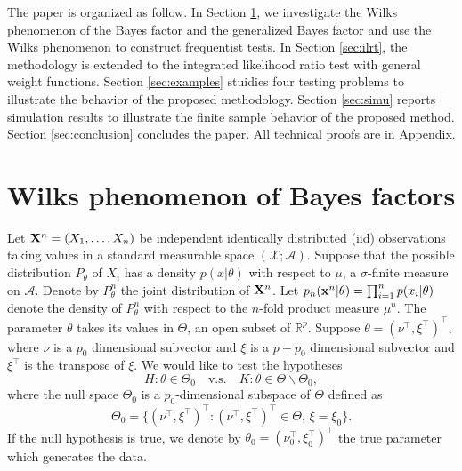 \documentclass[11pt]{article}
\newcommand{\myT}{\intercal}
\theoremstyle{plain}
\theoremstyle{definition}
\theoremstyle{remark}
\begin{document}
The paper is organized as follow.
In Section \ref{sec:wilks}, we investigate the Wilks phenomenon of the Bayes factor and the generalized Bayes factor and use the Wilks phenomenon to construct frequentist tests.
In Section \ref{sec:ilrt}, the methodology is extended to the integrated likelihood ratio test with general weight functions.
Section \ref{sec:examples} stuidies four testing problems to illustrate the behavior of the proposed methodology.
Section \ref{sec:simu} reports simulation results to illustrate the finite sample behavior of the proposed method.
Section \ref{sec:conclusion} concludes the paper.
All technical proofs are in Appendix.






\section{Wilks phenomenon of Bayes factors} \label{sec:wilks}

Let $\mathbf{X}^{n}=(X_1,\ldots,X_n)$ be independent identically distributed (iid) observations taking values in a standard measurable space $(\mathcal{X};\mathscr{A})$.
Suppose that the possible distribution $P_\theta$ of $X_i$ has a density $p(x|\theta)$ with respect to $\mu$, a $\sigma$-finite measure on $\mathscr{A}$. %
Denote by $P_{\theta}^{n}$ the joint distribution of $\mathbf{X}^{n}$.
Let $p_{n}(\mathbf{x}^{n}|\theta)=\prod_{i=1}^n p(x_i|\theta)$ denote the density of $P_{\theta}^n$ with respect to the $n$-fold product measure $\mu^n$.
The parameter $\theta$ takes its values in $\Theta$, an open subset of $\mathbb{R}^{p}$.
Suppose $\theta=(\nu^\myT ,\xi^\myT )^\myT $, where $\nu$ is a $p_0$ dimensional subvector and $\xi$ is a $p-p_0$ dimensional subvector and $\xi^\myT$ is the transpose of $\xi$.
 We would like to test the hypotheses
\begin{equation*}
    H:\theta\in\Theta_0\quad \text{v.s.}\quad K:\theta\in\Theta\backslash \Theta_0,
\end{equation*}
where the null space $\Theta_0$ is a $p_0$-dimensional subspace of $\Theta$ defined as
\begin{equation*}
    \Theta_0=\{(\nu^\myT ,\xi^\myT )^\myT :(\nu^\myT ,\xi^\myT )^\myT \in\Theta, \, \xi=\xi_0\}.
\end{equation*}
If the null hypothesis is true, we denote by $\theta_0=(\nu_0^\myT ,\xi_0^\myT )^\myT $ the true parameter which generates the data.
\end{document}
